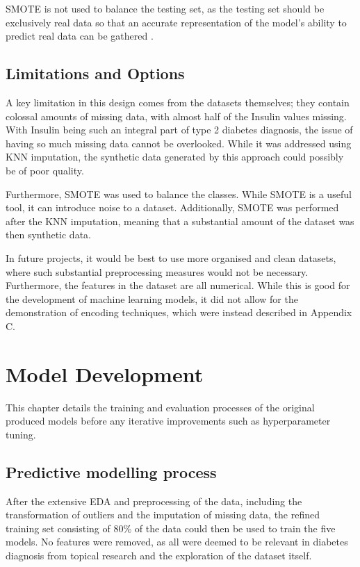 \documentclass[12pt]{report}
\newcommand{\para}{\vspace{8pt}\noindent}
\begin{document}
\para SMOTE is not used to balance the testing set, as the testing set should be exclusively real data
so that an accurate representation of the model's ability to predict real data can be gathered \autocite{ozbun_properly_2021}.



\section{Limitations and Options}
A key limitation in this design comes from the datasets themselves; they contain colossal amounts of missing data, 
with almost half of the Insulin values missing. With Insulin being such an integral part of type 2 diabetes diagnosis,
the issue of having so much missing data cannot be overlooked. While it was addressed using KNN imputation, the synthetic 
data generated by this approach could possibly be of poor quality.

\para Furthermore, SMOTE was used to balance the classes. While SMOTE is a useful tool, it can introduce noise to a dataset.
Additionally, SMOTE was performed after the KNN imputation, meaning that a substantial amount of the dataset was then synthetic data.

\para In future projects, it would be best to use more organised and clean datasets, where such substantial 
preprocessing measures would not be necessary. Furthermore, the features in the dataset are all numerical.
While this is good for the development of machine learning models, it did not allow for the demonstration 
of encoding techniques, which were instead described in Appendix C.

\chapter{Model Development} %
This chapter details the training and evaluation processes of the original produced models
before any iterative improvements such as hyperparameter tuning.


\section{Predictive modelling process}
After the extensive EDA and preprocessing of the data, including the transformation of outliers and the imputation of
missing data, the refined training set consisting of 80\% of the data could then be used to train the five models. 
No features were removed, as all were deemed to be relevant in diabetes diagnosis from topical research and the
exploration of the dataset itself. 
\end{document}
